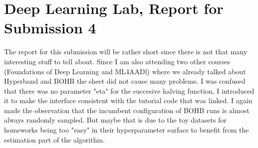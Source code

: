 \documentclass{scrartcl}
\begin{document}
\section*{Deep Learning Lab, Report for Submission 4}
The report for this submission will be rather short since there is not that many interesting stuff to tell about. Since I am also attending two other courses (Foundations of Deep Learning and ML4AADl) where we already talked about Hyperband and BOHB the sheet did not cause many problems. I was confused that there was no parameter "eta" for the succesive halving function, I introduced it to make the interface consistent with the tutorial code that was linked.
I again made the observation that the incumbent configuration of BOHB runs is almost always randomly sampled. But maybe that is due to the toy datasets for homeworks being too "easy" in their hyperparameter surface to benefit from the estimation part of the algorithm.
\end{document}
